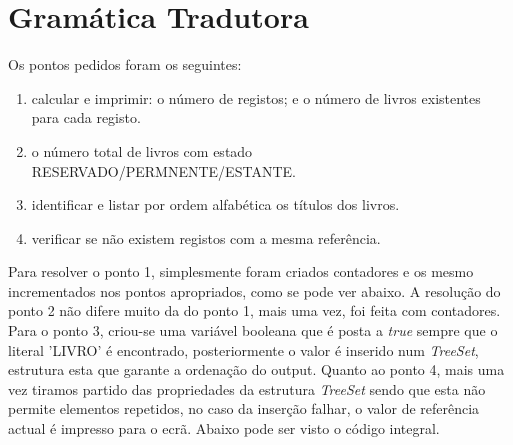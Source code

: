 \documentclass[a4paper,11pt,openright,openbib]{article}
\begin{document}
\section{Gramática Tradutora} %
\label{sec:gram_tica_tradutora}

Os pontos pedidos foram os seguintes:

\begin{enumerate}
	\item calcular e imprimir: o número de registos; e o número de livros existentes para cada registo.
	\item o número total de livros com estado RESERVADO/PERMNENTE/ESTANTE.
	\item identificar e listar por ordem alfabética os títulos dos livros.
	\item verificar se não existem registos com a mesma referência.
\end{enumerate}

Para resolver o ponto 1, simplesmente foram criados contadores e os mesmo incrementados nos pontos apropriados, como se pode ver abaixo.
A resolução do ponto 2 não difere muito da do ponto 1, mais uma vez, foi feita com contadores.
Para o ponto 3, criou-se uma variável booleana que é posta a \textit{true} sempre que o literal 'LIVRO' é encontrado, posteriormente o valor é inserido num \textit{TreeSet},
estrutura esta que garante a ordenação do output.
Quanto ao ponto 4, mais uma vez tiramos partido das propriedades da estrutura \textit{TreeSet} sendo que esta não permite elementos repetidos, no caso da inserção falhar,
o valor de referência actual é impresso para o ecrã.
Abaixo pode ser visto o código integral. 
\end{document}
